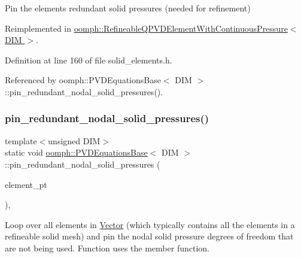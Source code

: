 Pin the element\textquotesingle{}s redundant solid pressures (needed for refinement) 



Reimplemented in \hyperlink{classoomph_1_1RefineableQPVDElementWithContinuousPressure_a5f2c7682c947acf7ce7689a30d31f48a}{oomph\+::\+Refineable\+Q\+P\+V\+D\+Element\+With\+Continuous\+Pressure$<$ D\+I\+M $>$}.



Definition at line 160 of file solid\+\_\+elements.\+h.



Referenced by oomph\+::\+P\+V\+D\+Equations\+Base$<$ D\+I\+M $>$\+::pin\+\_\+redundant\+\_\+nodal\+\_\+solid\+\_\+pressures().

\mbox{\label{classoomph_1_1PVDEquationsBase_a055460413e57cf52649c4db96f50f5c1}} 
\subsubsection{\texorpdfstring{pin\+\_\+redundant\+\_\+nodal\+\_\+solid\+\_\+pressures()}{pin\_redundant\_nodal\_solid\_pressures()}}
{\footnotesize\ttfamily template$<$unsigned D\+IM$>$ \\
static void \hyperlink{classoomph_1_1PVDEquationsBase}{oomph\+::\+P\+V\+D\+Equations\+Base}$<$ D\+IM $>$\+::pin\+\_\+redundant\+\_\+nodal\+\_\+solid\+\_\+pressures (\begin{DoxyParamCaption}\item[{const \hyperlink{classoomph_1_1Vector}{Vector}$<$ \hyperlink{classoomph_1_1GeneralisedElement}{Generalised\+Element} $\ast$$>$ \&}]{element\+\_\+pt }\end{DoxyParamCaption})\hspace{0.3cm}{\ttfamily [inline]}, {\ttfamily [static]}}



Loop over all elements in \hyperlink{classoomph_1_1Vector}{Vector} (which typically contains all the elements in a refineable solid mesh) and pin the nodal solid pressure degrees of freedom that are not being used. Function uses the member function. 


